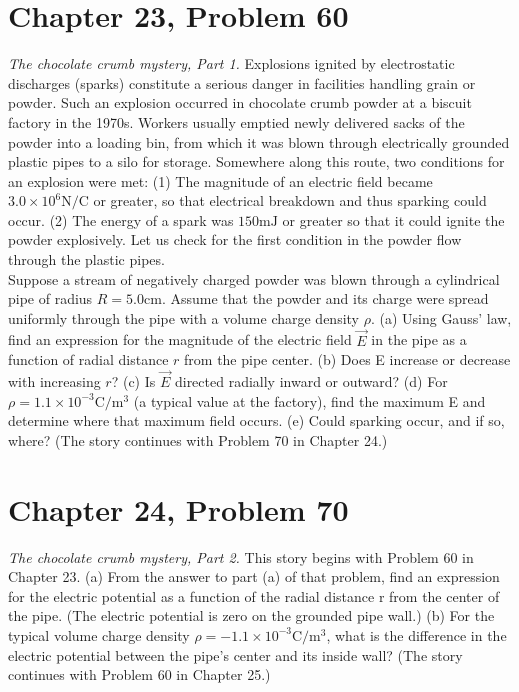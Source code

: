 \documentclass[12pt]{article}
\begin{document}
\section{Chapter 23, Problem 60}
\textit{The chocolate crumb mystery, Part 1.} Explosions ignited by electrostatic discharges (sparks) constitute a serious danger in facilities handling grain or powder. Such an explosion occurred in chocolate crumb powder at a biscuit factory in the 1970s. Workers usually emptied newly delivered sacks of the powder into a loading bin, from which it was blown through electrically grounded plastic pipes to a silo for storage. Somewhere along this route, two conditions for an explosion were met: (1) The magnitude of an electric field became $3.0 \times 10^6 \unit{\newton/\coulomb}$ or greater, so that electrical breakdown and thus sparking could occur. (2) The energy of a spark was $150 \unit{\milli\joule}$ or greater so that it could ignite the powder explosively. Let us check for the first condition in the powder flow through the plastic pipes.\\
Suppose a stream of negatively charged powder was blown through a cylindrical pipe of radius $R = 5.0 \unit{\centi\meter}$. Assume that the powder and its charge were spread uniformly through the pipe with a volume charge density $\rho$. (a) Using Gauss' law, find an expression for the magnitude of the electric field $\vec{E}$ in the pipe as a function of radial distance $r$ from the pipe center. (b) Does E increase or decrease with increasing $r$? (c) Is $\vec{E}$ directed radially inward or outward? (d) For $\rho = 1.1 \times 10^{-3} \unit{\coulomb/\meter^3}$ (a typical value at the factory), find the maximum E and determine where that maximum field occurs. (e) Could sparking occur, and if so, where? (The story continues with Problem 70 in Chapter 24.)

\section{Chapter 24, Problem 70}
\textit{The chocolate crumb mystery, Part 2.} This story begins with Problem 60 in Chapter 23. (a) From the answer to part (a) of that problem, find an expression for the electric potential as a function of the radial distance r from the center of the pipe. (The electric potential is zero on the grounded pipe wall.) (b) For the typical volume charge density $\rho = -1.1 \times 10^{-3} \unit{\coulomb/\meter^3}$, what is the difference in the electric potential between the pipe's center and its inside wall? (The story continues with Problem 60 in Chapter 25.)
\end{document}
